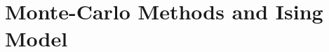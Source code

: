 \documentclass[../classnotes.tex]{subfiles}
\begin{document}
\chapter{Monte-Carlo Methods and Ising Model}

\end{document}
